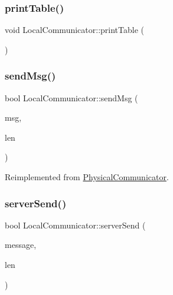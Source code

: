\mbox{\label{classLocalCommunicator_a96569a4dc0b07439ab880385428a53f7}} 
\subsubsection{\texorpdfstring{print\+Table()}{printTable()}}
{\footnotesize\ttfamily void Local\+Communicator\+::print\+Table (\begin{DoxyParamCaption}{ }\end{DoxyParamCaption})\hspace{0.3cm}{\ttfamily [inline]}}

\mbox{\label{classLocalCommunicator_afb8fc8a82069dac7bf08f736fa76c4c8}} 
\subsubsection{\texorpdfstring{send\+Msg()}{sendMsg()}}
{\footnotesize\ttfamily bool Local\+Communicator\+::send\+Msg (\begin{DoxyParamCaption}\item[{\hyperlink{structSpaMessage}{Spa\+Message} $\ast$}]{msg,  }\item[{ssize\+\_\+t}]{len }\end{DoxyParamCaption})\hspace{0.3cm}{\ttfamily [virtual]}}



Reimplemented from \hyperlink{classPhysicalCommunicator_a9fc5595b693f9908a20d0e64a6579bb5}{Physical\+Communicator}.

\mbox{\label{classLocalCommunicator_a6175c2c35727bb081c5f518e1750dd86}} 
\subsubsection{\texorpdfstring{server\+Send()}{serverSend()}}
{\footnotesize\ttfamily bool Local\+Communicator\+::server\+Send (\begin{DoxyParamCaption}\item[{\hyperlink{structSpaMessage}{Spa\+Message} $\ast$}]{message,  }\item[{ssize\+\_\+t}]{len }\end{DoxyParamCaption})\hspace{0.3cm}{\ttfamily [virtual]}}

